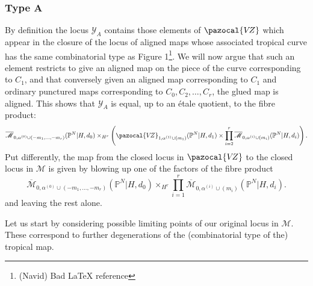 \documentclass[11pt]{amsart}
\newcommand{\mathsq}[1]{#1}
\newcommand{\M}[4]{\overline{\mathcal{M}}_{#1,#2}(#3,#4)}
\newcommand{\PP}{\mathbb P}
\newcommand{\VZ}{\pazocal{V\!Z}}
\newcommand{\Mcal}{\mathcal{M}}
\newcommand{\Ycal}{\mathcal{Y}}
\theoremstyle{definition}
\theoremstyle{definition}
\begin{document}
\subsubsection{Type A} By definition the locus $\Ycal_A$ contains those elements of $\VZ$ which appear in the closure of the locus of aligned maps whose associated tropical curve has the same combinatorial type as Figure 1\footnote{(Navid) Bad LaTeX reference}. We will now argue that such an element restricts to give an aligned map on the piece of the curve corresponding to $\mathsq{C}_1$, and that conversely given an aligned map corresponding to $\mathsq{C}_1$ and ordinary punctured maps corresponding to $\mathsq{C}_0,\mathsq{C}_2,\ldots,\mathsq{C}_r$, the glued map is aligned. This shows that $\Ycal_A$ is equal, up to an \'etale quotient, to the fibre product:
\begin{equation*}\M{0}{\alpha^{(0)}\cup (-m_1,\ldots,-m_r)}{\PP^N|H}{d_0}\times_{H^r}\left(\VZ_{1,\alpha^{(1)}\cup(m_1)}(\PP^N|H,d_1)\times\prod_{i=2}^r\M{0}{\alpha^{(i)}\cup(m_i)}{\PP^N|H}{d_i}\right). \end{equation*}
Put differently, the map from the closed locus in $\VZ$ to the closed locus in $\Mcal$ is given by blowing up one of the factors of the fibre product
\begin{equation*}\M{0}{\alpha^{(0)}\cup (-m_1,\ldots,-m_r)}{\PP^N|H}{d_0}\times_{H^r}\prod_{i=1}^r\M{0}{\alpha^{(i)}\cup(m_i)}{\PP^N|H}{d_i}. \end{equation*}
and leaving the rest alone.

Let us start by considering possible limiting points of our original locus in $\Mcal$. These correspond to further degenerations of the (combinatorial type of the) tropical map.
\end{document}
